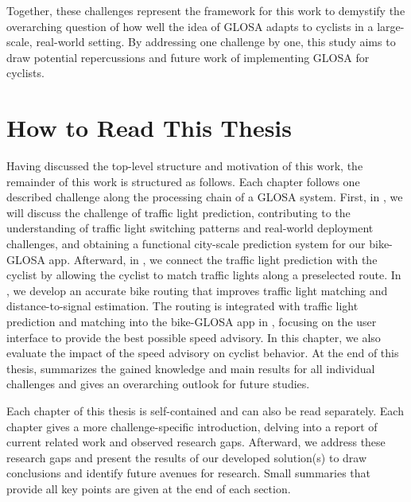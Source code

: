 Together, these challenges represent the framework for this work to demystify the overarching question of how well the idea of GLOSA adapts to cyclists in a large-scale, real-world setting. By addressing one challenge by one, this study aims to draw potential repercussions and future work of implementing GLOSA for cyclists.

\section{How to Read This Thesis}

Having discussed the top-level structure and motivation of this work, the remainder of this work is structured as follows. Each chapter follows one described challenge along the processing chain of a GLOSA system. First, in , we will discuss the challenge of traffic light prediction, contributing to the understanding of traffic light switching patterns and real-world deployment challenges, and obtaining a functional city-scale prediction system for our bike-GLOSA app. Afterward, in , we connect the traffic light prediction with the cyclist by allowing the cyclist to match traffic lights along a preselected route. In , we develop an accurate bike routing that improves traffic light matching and distance-to-signal estimation. The routing is integrated with traffic light prediction and matching into the bike-GLOSA app in , focusing on the user interface to provide the best possible speed advisory. In this chapter, we also evaluate the impact of the speed advisory on cyclist behavior. At the end of this thesis,  summarizes the gained knowledge and main results for all individual challenges and gives an overarching outlook for future studies.

Each chapter of this thesis is self-contained and can also be read separately. Each chapter gives a more challenge-specific introduction, delving into a report of current related work and observed research gaps. Afterward, we address these research gaps and present the results of our developed solution(s) to draw conclusions and identify future avenues for research. Small summaries that provide all key points are given at the end of each section.

